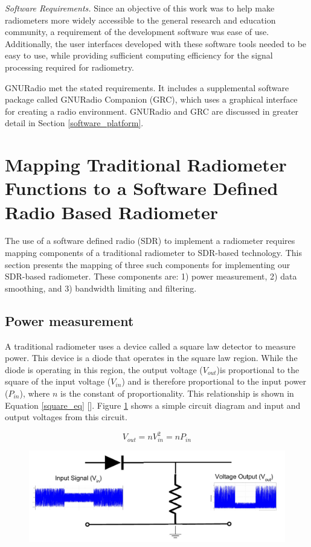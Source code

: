 \emph{Software Requirements.}  Since an objective of this work was to help make radiometers more widely accessible to the general research and education community, a requirement of the development software was ease of use.  Additionally, the user interfaces developed with these software tools needed to be easy to use, while providing sufficient computing efficiency for the signal processing required for radiometry.

GNURadio met the stated requirements.  It includes a supplemental software package called GNURadio Companion (GRC), which uses a graphical interface for creating a radio environment.  GNURadio and GRC are discussed in greater detail in Section \ref{software_platform}.

\section{Mapping Traditional Radiometer Functions to a Software Defined Radio Based Radiometer}

The use of a software defined radio (SDR) to implement a radiometer requires mapping components of a traditional radiometer to SDR-based technology.  This section presents the mapping of three such components for implementing our SDR-based radiometer.  These components are:  1) power measurement, 2) data smoothing, and 3) bandwidth limiting and filtering.

\subsection{Power measurement}

A traditional radiometer uses a device called a square law detector to measure power.  This device is a diode that operates in the square law region.  While the diode is operating in this region, the output voltage ($V_{out}$)is proportional to the square of the input voltage ($V_{in}$) and is therefore proportional to the input power ($P_{in}$), where $n$ is the constant of proportionality.  This relationship is shown in Equation \ref{square_eq} [\cite{Navy_detector}].  Figure \ref{square_law_simple} shows a simple circuit diagram and input and output voltages from this circuit.

\begin{equation}\label{square_eq}
V_{out} = nV_{in}^2 = nP_{in}
\end{equation}

{\begin{figure}[h!tb] 
\centering
\includegraphics[width=17cm]{Images/square_law.pdf}
\label{square_law_simple}
\end{figure}
}

